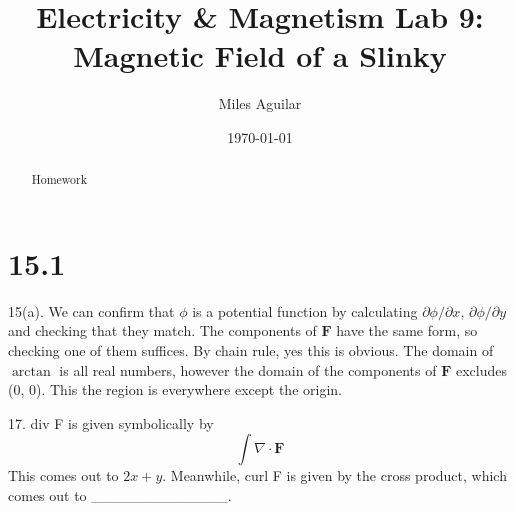 \documentclass[%
 aip,
 jmp,%
 amsmath,amssymb,
 reprint,%
]{revtex4-2}
\begin{document}

\title[E \& M Lab 9: Magnetic Field of a Slinky]{Electricity \& Magnetism Lab 9:\\Magnetic Field of a Slinky}

\author{Miles Aguilar}

\date{\today}%

\begin{abstract}

  Homework

\end{abstract}

\maketitle

\vspace{-20px}

\begin{quotation}
    \text{}
\end{quotation}

\vspace{-10px}

\section{\label{sec:Intro}15.1}

15(a). We can confirm that $\phi$ is a potential function by calculating $\partial{\phi}/\partial{x}$, $\partial{\phi}/\partial{y}$ and checking that they match. The components of $\mathbf{F}$ have the same form, so checking one of them suffices. By chain rule, yes this is obvious. The domain of $\arctan$ is all real numbers, however the domain of the components of $\mathbf{F}$ excludes (0, 0). This the region is everywhere except the origin.\\\indent



17. div F is given symbolically by \[\int{\nabla \cdot \mathbf{F}}\] This comes out to $2x+y$. Meanwhile, curl F is given by the cross product, which comes out to \_\_\_\_\_\_\_\_\_\_\_\_\_.











\end{document}
